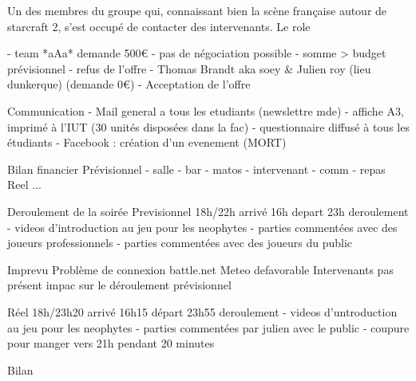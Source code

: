     Un des membres du groupe qui, connaissant bien la scène française
    autour de starcraft 2, s'est occupé de contacter des intervenants. Le
    role

		- team *aAa* demande 500€
                    - pas de négociation possible
                    - somme > budget prévisionnel
                    - refus de l'offre
    - Thomas Brandt aka soey & Julien roy (lieu dunkerque) (demande 0€)
        - Acceptation de l'offre

        Communication
                - Mail general a tous les etudiants (newslettre mde)
                - affiche A3, imprimé à l'IUT (30 unités disposées dans la fac)
                - questionnaire diffusé à tous les étudiants
                - Facebook : création d'un evenement (MORT)

        Bilan financier
                Prévisionnel
                    - salle
                    - bar
                    - matos
                    - intervenant
                    - comm
                    - repas
                Reel
                   ...

        Deroulement de la soirée
                Previsionnel
                    18h/22h
                    arrivé 16h
                    depart 23h
                    deroulement
                        - videos d'introduction au jeu pour les neophytes
                        - parties commentées avec des joueurs professionnels
                        - parties commentées avec des joueurs du public

                Imprevu
                   Problème de connexion battle.net
                   Meteo defavorable
                   Intervenants pas présent
                   impac sur le déroulement prévisionnel

                Réel
                    18h/23h20
                    arrivé 16h15
                    départ 23h55
                    deroulement
                        - videos d'untroduction au jeu pour les neophytes
                        - parties commentées par julien avec le public
                        - coupure pour manger vers 21h pendant 20 minutes

Bilan
